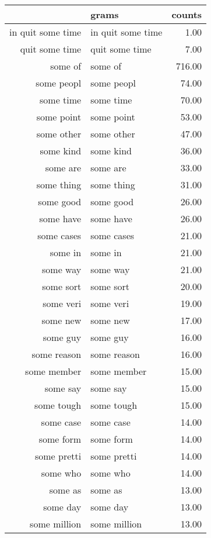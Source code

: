 \begin{table}[ht]
\centering
\begin{tabular}{rlr}
  \hline
 & grams & counts \\ 
  \hline
in quit some time & in quit some time & 1.00 \\ 
  quit some time & quit some time & 7.00 \\ 
  some of & some of & 716.00 \\ 
  some peopl & some peopl & 74.00 \\ 
  some time & some time & 70.00 \\ 
  some point & some point & 53.00 \\ 
  some other & some other & 47.00 \\ 
  some kind & some kind & 36.00 \\ 
  some are & some are & 33.00 \\ 
  some thing & some thing & 31.00 \\ 
  some good & some good & 26.00 \\ 
  some have & some have & 26.00 \\ 
  some cases & some cases & 21.00 \\ 
  some in & some in & 21.00 \\ 
  some way & some way & 21.00 \\ 
  some sort & some sort & 20.00 \\ 
  some veri & some veri & 19.00 \\ 
  some new & some new & 17.00 \\ 
  some guy & some guy & 16.00 \\ 
  some reason & some reason & 16.00 \\ 
  some member & some member & 15.00 \\ 
  some say & some say & 15.00 \\ 
  some tough & some tough & 15.00 \\ 
  some case & some case & 14.00 \\ 
  some form & some form & 14.00 \\ 
  some pretti & some pretti & 14.00 \\ 
  some who & some who & 14.00 \\ 
  some as & some as & 13.00 \\ 
  some day & some day & 13.00 \\ 
  some million & some million & 13.00 \\ 

\end{tabular}
\end{table}
